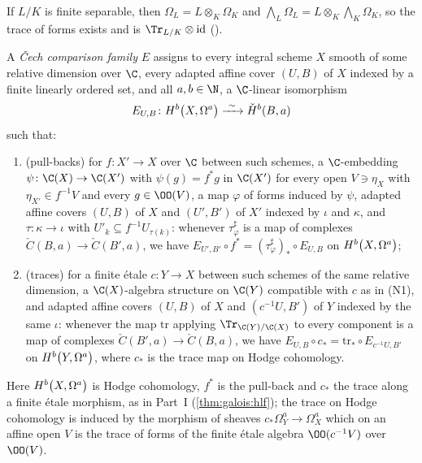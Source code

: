 If $L/K$ is finite separable, then $\Omega_L=L\otimes_K\Omega_K$ and $\bigwedge_L\Omega_L=L\otimes_K\bigwedge_K\Omega_K$, so the trace of forms
exists and is $\Tr_{L/K}\otimes\mathrm{id}$ ().

\begin{definition}\label{pf:hlf-cech:def:cmpfam}
A \emph{\v{C}ech comparison family} $E$ assigns to every integral scheme $X$ smooth of some relative dimension over $\C$, every adapted
affine cover $(U,B)$ of $X$ indexed by a finite linearly ordered set, and all $a,b\in\N$, a $\C$-linear isomorphism
\[
  E_{U,B}\colon\hlfcechHdg{X}{a}{b}\xrightarrow{\ \sim\ }\check H^b(B,a)
\]
such that:
\begin{enumerate}[label=(N\arabic*),nosep]
\item (pull-backs) for $f\colon X'\to X$ over $\C$ between such schemes, a $\C$-embedding $\psi\colon\C(X)\to\C(X')$ with
  $\psi(g)=f^*g$ in $\C(X')$ for every open $V\ni\eta_X$ with $\eta_{X'}\in f^{-1}V$ and every $g\in\OO(V)$, a map $\varphi$ of forms induced by
  $\psi$, adapted affine covers $(U,B)$ of $X$ and $(U',B')$ of $X'$ indexed by $\iota$ and $\kappa$, and $\tau\colon\kappa\to\iota$ with
  $U'_k\subseteq f^{-1}U_{\tau(k)}$: whenever $\tau^\sharp_\varphi$ is a map of complexes $\check C(B,a)\to\check C(B',a)$, we have
  $E_{U',B'}\circ f^*=(\tau^\sharp_\varphi)_*\circ E_{U,B}$ on $\hlfcechHdg{X}{a}{b}$;
\item (traces) for a finite \'etale $c\colon Y\to X$ between such schemes of the same relative dimension, a $\C(X)$-algebra structure on
  $\C(Y)$ compatible with $c$ as in (N1), and adapted affine covers $(U,B)$ of $X$ and $(c^{-1}U,B')$ of $Y$ indexed by the same $\iota$:
  whenever the map $\mathrm{tr}$ applying $\Tr_{\C(Y)/\C(X)}$ to every component is a map of complexes $\check C(B',a)\to\check C(B,a)$, we have
  $E_{U,B}\circ c_*=\mathrm{tr}_*\circ E_{c^{-1}U,B'}$ on $\hlfcechHdg{Y}{a}{b}$, where $c_*$ is the trace map on Hodge cohomology.
\end{enumerate}
\end{definition}

Here $\hlfcechHdg{X}{a}{b}$ is Hodge cohomology, $f^*$ is the pull-back and $c_*$ the trace along a finite \'etale morphism, as in Part~I
(\cref{thm:galois:hlf}); the trace on Hodge cohomology is induced by the morphism of sheaves $c_*\Omega^a_Y\to\Omega^a_X$ which on an affine open
$V$ is the trace of forms of the finite \'etale algebra $\OO(c^{-1}V)$ over $\OO(V)$.

